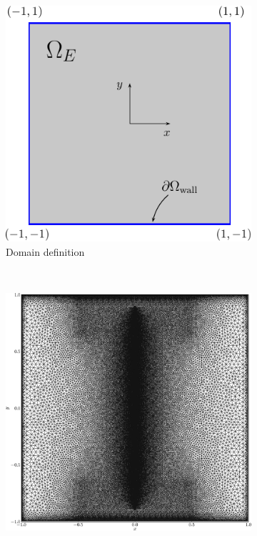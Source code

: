 	\begin{figure}[t]
     \centering
     \begin{subfigure}[t]{0.45\textwidth}
             \includegraphics[width=\textwidth]{figures/eulerian/clercxBruneauDomainDefinition-crop.pdf}
             \caption{Domain definition}
             \label{fig:clercxBruneauDomainDefinition}
     \end{subfigure}%
     ~ %
     \begin{subfigure}[t]{0.45\textwidth}
             \includegraphics[width=\textwidth]{figures/eulerian/clercxBruneauDomainMesh-crop.png}

\end{subfigure}
\end{figure}
